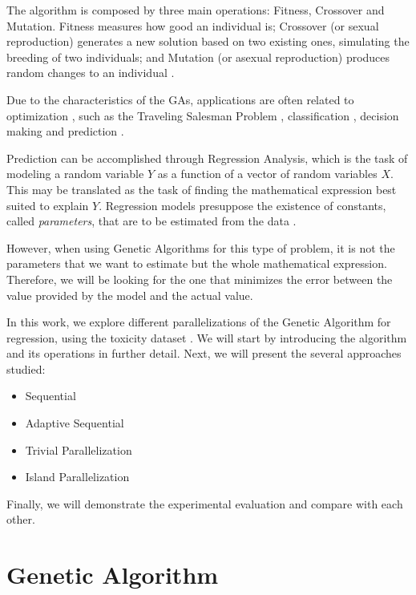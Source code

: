\documentclass[runningheads]{llncs}
\begin{document}
The algorithm is composed by three main operations: Fitness, Crossover and Mutation. Fitness measures how good an individual is; Crossover (or sexual reproduction) generates a new solution based on two existing ones, simulating the breeding of two individuals; and Mutation (or asexual reproduction) produces random changes to an individual \cite{langdon1995genetic}.

Due to the characteristics of the GAs, applications are often related to optimization \cite{sivanandam2008genetic}, such as the Traveling Salesman Problem \cite{grefenstette1985genetic}, classification \cite{5340522}, decision making \cite{George:2012:GAB:2345396.2345426} and prediction \cite{etemadi2009genetic}.

Prediction can be accomplished through Regression Analysis, which is the task of modeling a random variable $Y$ as a function of a vector of random variables $X$. This may be translated as the task of finding the mathematical expression best suited to explain $Y$. Regression models presuppose the existence of constants, called \textit{parameters}, that are to be estimated from the data \cite{rawlings2001applied}.

However, when using Genetic Algorithms for this type of problem, it is not the parameters that we want to estimate but the whole mathematical expression. Therefore, we will be looking for the one that minimizes the error between the value provided by the model and the actual value.

In this work, we explore different parallelizations of the Genetic Algorithm for regression, using the toxicity dataset \cite{krawiec2013genetic}. We will start by introducing the algorithm and its operations in further detail. Next, we will present the several approaches studied:

\begin{itemize}
\item Sequential
\item Adaptive Sequential
\item Trivial Parallelization
\item Island Parallelization
\end{itemize}

Finally, we will demonstrate the experimental evaluation and compare with each other.

\section{Genetic Algorithm}
\end{document}
